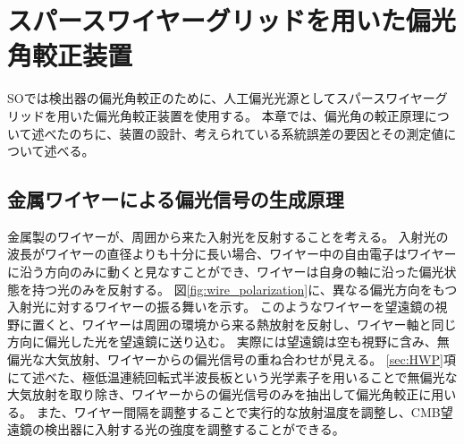 \documentclass[../../main.tex]{subfiles}
\begin{document}
\chapter{スパースワイヤーグリッドを用いた偏光角較正装置}
\label{chap:wiregrid}
SOでは検出器の偏光角較正のために、人工偏光光源としてスパースワイヤーグリッドを用いた偏光角較正装置を使用する\cite{Tajima_2012}\cite{swg:Murata_2023}。
本章では、偏光角の較正原理について述べたのちに、装置の設計、考えられている系統誤差の要因とその測定値について述べる。

\section{金属ワイヤーによる偏光信号の生成原理}
\label{sec:wiregrid_principle}
金属製のワイヤーが、周囲から来た入射光を反射することを考える。
入射光の波長がワイヤーの直径よりも十分に長い場合、ワイヤー中の自由電子はワイヤーに沿う方向のみに動くと見なすことができ、ワイヤーは自身の軸に沿った偏光状態を持つ光のみを反射する。
図\ref{fig:wire_polarization}に、異なる偏光方向をもつ入射光に対するワイヤーの振る舞いを示す。
このようなワイヤーを望遠鏡の視野に置くと、ワイヤーは周囲の環境から来る熱放射を反射し、ワイヤー軸と同じ方向に偏光した光を望遠鏡に送り込む。
実際には望遠鏡は空も視野に含み、無偏光な大気放射、ワイヤーからの偏光信号の重ね合わせが見える。
\ref{sec:HWP}項にて述べた、極低温連続回転式半波長板という光学素子を用いることで無偏光な大気放射を取り除き、ワイヤーからの偏光信号のみを抽出して偏光角較正に用いる。
また、ワイヤー間隔を調整することで実行的な放射温度を調整し、CMB望遠鏡の検出器に入射する光の強度を調整することができる。
\end{document}
